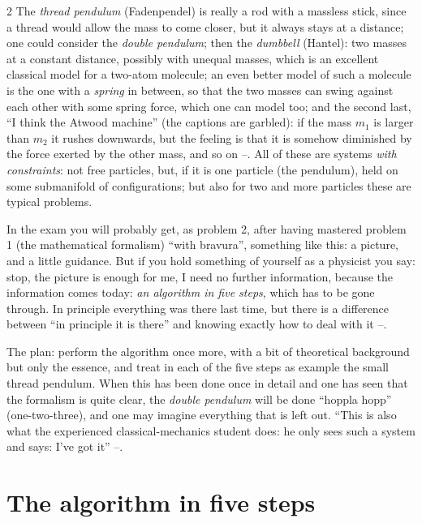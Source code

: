 \begin{paracol}{2}
The \emph{thread pendulum} (Fadenpendel) is really a rod with a massless stick, since a thread would allow the mass to come closer, but it always stays at a distance; one could consider the \emph{double pendulum}; then the \emph{dumbbell} (Hantel): two masses at a constant distance, possibly with unequal masses, which is an excellent classical model for a two-atom molecule; an even better model of such a molecule is the one with a \emph{spring} in between, so that the two masses can swing against each other with some spring force, which one can model too; and the second last, ``I think the Atwood machine'' (the captions are garbled): if the mass $m_1$ is larger than $m_2$ it rushes downwards, but the feeling is that it is somehow diminished by the force exerted by the other mass, and so on --. All of these are systems \emph{with constraints}: not free particles, but, if it is one particle (the pendulum), held on some submanifold of configurations; but also for two and more particles these are typical problems.

\begin{coursenote}\label{cn:pc-exam}
In the exam you will probably get, as problem 2, after having mastered problem 1 (the mathematical formalism) ``with bravura'', something like this: a picture, and a little guidance. But if you hold something of yourself as a physicist you say: stop, the picture is enough for me, I need no further information, because the information comes today: \emph{an algorithm in five steps}, which has to be gone through. In principle everything was there last time, but there is a difference between ``in principle it is there'' and knowing exactly how to deal with it --.
\end{coursenote}

The plan: perform the algorithm once more, with a bit of theoretical background but only the essence, and treat in each of the five steps as example the small thread pendulum. When this has been done once in detail and one has seen that the formalism is quite clear, the \emph{double pendulum} will be done ``hoppla hopp'' (one-two-three), and one may imagine everything that is left out. ``This is also what the experienced classical-mechanics student does: he only sees such a system and says: I've got it'' --.

\section{The algorithm in five steps}\label{sec:pc-algorithm}


\end{paracol}
